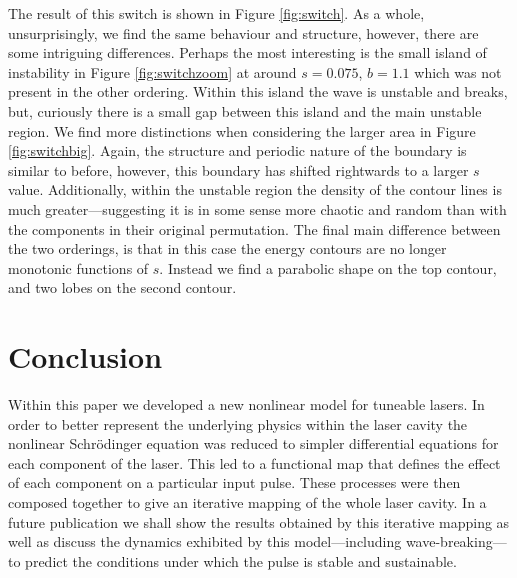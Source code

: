 \documentclass[10pt,twocolumn,a4paper]{article}
\begin{document}
The result of this switch is shown in Figure \ref{fig:switch}. As a whole, unsurprisingly, we find the same behaviour and structure, however, there are some intriguing differences. Perhaps the most interesting is the small island of instability in Figure \ref{fig:switchzoom} at around $s = 0.075$, $b = 1.1$ which was not present in the other ordering. Within this island the wave is unstable and breaks, but, curiously there is a small gap between this island and the main unstable region. We find more distinctions when considering the larger area in Figure \ref{fig:switchbig}. Again, the structure and periodic nature of the boundary is similar to before, however, this boundary has shifted rightwards to a larger $s$ value. Additionally, within the unstable region the density of the contour lines is much greater---suggesting it is in some sense more chaotic and random than with the components in their original permutation. The final main difference between the two orderings, is that in this case the energy contours are no longer monotonic functions of $s$. Instead we find a parabolic shape on the top contour, and two lobes on the second contour. \\






\section{Conclusion}
Within this paper we developed a new nonlinear model for tuneable lasers. In order to better represent the underlying physics within the laser cavity the nonlinear Schr\"{o}dinger equation was reduced to simpler differential equations for each component of the laser. This led to a functional map that defines the effect of each component on a particular input pulse. These processes were then composed together to give an iterative mapping of the whole laser cavity. In a future publication we shall show the results obtained by this iterative mapping as well as discuss the dynamics exhibited by this model---including wave-breaking---to predict the conditions under which the pulse is stable and sustainable.


\end{document}
